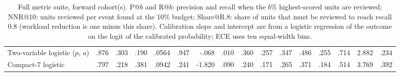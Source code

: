 \documentclass[11pt]{article}
\newcommand{\compact}{Compact-7\xspace}
\begin{document}
\begin{table}[!t]
{\begin{tabular}{@{}lrrrrrrrrrrrrrrr@{}}
Two-variable logistic ($p$, $a$) & .876 & .303 & .190 & .0564 & .947 & -.068 & .010 & .360 & .257 & .347 & .486 & .255 & .714 & 2.882 & .234 \\
\compact logistic & .797 & .218 & .381 & .0942 & .241 & -1.820 & .090 & .240 & .171 & .265 & .371 & .184 & .514 & 3.769 & .392 \\
\bottomrule
\end{tabular}}
\caption{Full metric suite, forward cohort(s). P@$b$ and R@$b$: precision and recall when the $b$\% highest-scored units are reviewed; NNR@10: units reviewed per event found at the 10\% budget; Share@R.8: share of units that must be reviewed to reach recall 0.8 (workload reduction is one minus this share). Calibration slope and intercept are from a logistic regression of the outcome on the logit of the calibrated probability; ECE uses ten equal-width bins.}
\label{tab:metrics_forward}
\end{table}
\end{document}
